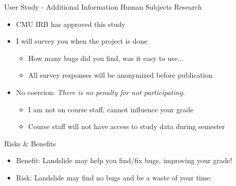 \documentclass[xcolor=dvipsnames]{beamer}
\begin{document}
\begin{frame}{User Study - Additional Information}
	Human Subjects Research
	\begin{itemize}
		\item CMU IRB has approved this study
		\item I will survey you when the project is done
		\begin{itemize}
			\item How many bugs did you find, was it easy to use...
			\item All survey responses will be anonymized before publication
		\end{itemize}
		\item No coercion: {\em There is no penalty for not participating.}
		\begin{itemize}
			\item I am not on course staff, cannot influence your grade
			\item Course staff will not have access to study data during semester
		\end{itemize}
	\end{itemize}
	\pause
	\linegap

	Risks \& Benefits
	\begin{itemize}
		\item Benefit: Landslide may help you find/fix bugs, improving your grade!
		\item Risk: Landslide may find no bugs and be a waste of your time.
	\end{itemize}
\end{frame}
\end{document}
